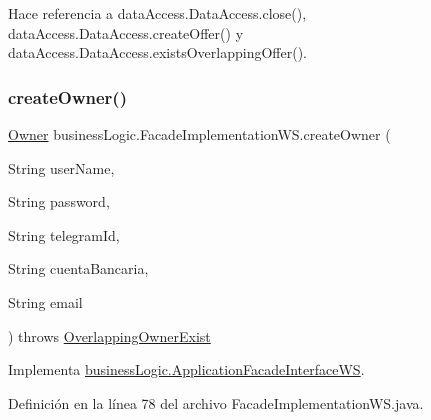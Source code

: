 Hace referencia a data\+Access.\+Data\+Access.\+close(), data\+Access.\+Data\+Access.\+create\+Offer() y data\+Access.\+Data\+Access.\+exists\+Overlapping\+Offer().

\mbox{\label{classbusiness_logic_1_1_facade_implementation_w_s_ad7a2f26be66f4ae4cbc2a4ad89e74e53}} 
\subsubsection{\texorpdfstring{createOwner()}{createOwner()}}
{\footnotesize\ttfamily \mbox{\hyperlink{classdomain_1_1_owner}{Owner}} business\+Logic.\+Facade\+Implementation\+W\+S.\+create\+Owner (\begin{DoxyParamCaption}\item[{String}]{user\+Name,  }\item[{String}]{password,  }\item[{String}]{telegram\+Id,  }\item[{String}]{cuenta\+Bancaria,  }\item[{String}]{email }\end{DoxyParamCaption}) throws \mbox{\hyperlink{classexceptions_1_1_overlapping_owner_exist}{Overlapping\+Owner\+Exist}}}



Implementa \mbox{\hyperlink{interfacebusiness_logic_1_1_application_facade_interface_w_s_a3e5553805d4890c9c17cf2ab1b14a2d3}{business\+Logic.\+Application\+Facade\+Interface\+WS}}.



Definición en la línea 78 del archivo Facade\+Implementation\+W\+S.\+java.


\begin{DoxyCode}{0}

\end{DoxyCode}


